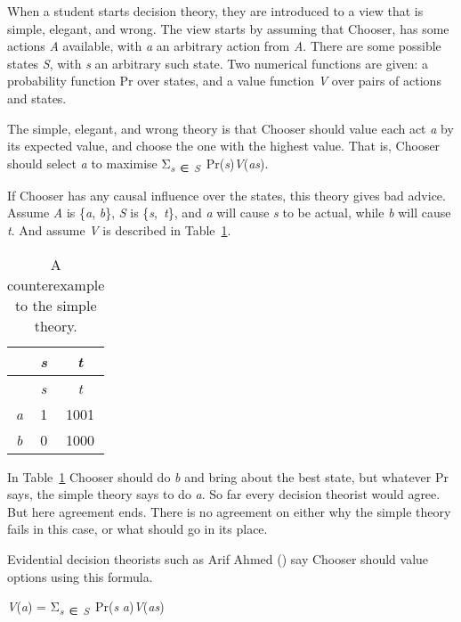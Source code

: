 \documentclass[
  10pt,
  letterpaper,
  DIV=11,
  numbers=noendperiod,
  twoside]{scrartcl}
\providecommand{\tightlist}{%
  \setlength{\itemsep}{0pt}\setlength{\parskip}{0pt}}\usepackage{longtable,booktabs,array}
\begin{document}
When a student starts decision theory, they are introduced to a view
that is simple, elegant, and wrong. The view starts by assuming that
Chooser, has some actions \emph{A} available, with \emph{a} an arbitrary
action from \emph{A}. There are some possible states \emph{S}, with
\emph{s} an arbitrary such state. Two numerical functions are given: a
probability function Pr over states, and a value function \emph{V} over
pairs of actions and states.

The simple, elegant, and wrong theory is that Chooser should value each
act \emph{a} by its expected value, and choose the one with the highest
value. That is, Chooser should select \emph{a} to maximise
Σ\textsubscript{\emph{s}~∈~\emph{S}}~Pr(\emph{s})\emph{V}(\emph{as}).

If Chooser has any causal influence over the states, this theory gives
bad advice. Assume \emph{A} is \{\emph{a}, \emph{b}\}, \emph{S} is
\{\emph{s},~\emph{t}\}, and \emph{a} will cause \emph{s} to be actual,
while \emph{b} will cause \emph{t}. And assume \emph{V} is described in
Table~\ref{tbl-joycewindow}.

\begin{longtable}[]{@{}ccc@{}}
\caption{A counterexample to the simple
theory.}\label{tbl-joycewindow}\tabularnewline
\toprule\noalign{}
& \emph{s} & \emph{t} \\
\midrule\noalign{}
\endfirsthead
\toprule\noalign{}
& \emph{s} & \emph{t} \\
\midrule\noalign{}
\endhead
\bottomrule\noalign{}
\endlastfoot
\emph{a} & 1 & 1001 \\
\emph{b} & 0 & 1000 \\
\end{longtable}

In Table~\ref{tbl-joycewindow} Chooser should do \emph{b} and bring
about the best state, but whatever Pr says, the simple theory says to do
\emph{a}. So far every decision theorist would agree. But here agreement
ends. There is no agreement on either why the simple theory fails in
this case, or what should go in its place.

Evidential decision theorists such as Arif Ahmed
() say Chooser should value options using
this formula.

\begin{description}
\tightlist
\item[EDT]
\emph{V}(\emph{a}) = Σ\textsubscript{\emph{s}~∈~\emph{S}}~Pr(\emph{s}
\textbar{} \emph{a})\emph{V}(\emph{as})
\end{description}
\end{document}
